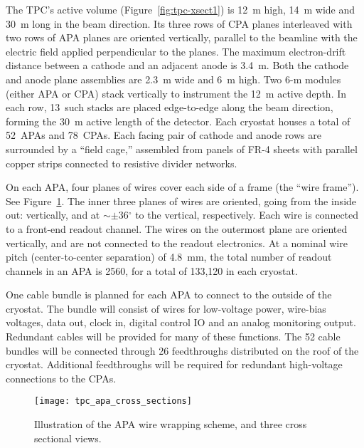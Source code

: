 The TPC's active volume (Figure~\ref{fig:tpc-xsect1}) is 12~m high, 14~m wide and 30~m long in the beam direction. 
Its three rows of CPA planes interleaved with two rows of APA planes 
are oriented vertically, parallel to the beamline with the  
electric field applied perpendicular to the planes.
The maximum electron-drift distance between a cathode and an adjacent 
anode is 3.4~m. Both the cathode and anode plane assemblies are 
2.3~m wide and 6~m high. Two 6-m modules (either APA or CPA)  stack vertically to 
instrument the 12~m active depth. In each row, 13~such stacks are placed 
edge-to-edge 
along the beam direction, forming the 30~m active length of the detector.
Each cryostat houses a total of 52~APAs and 78~CPAs.
Each facing pair of cathode and anode rows are surrounded by a 
``field cage,'' assembled from panels of FR-4 sheets with parallel copper strips connected to resistive divider networks. 

On each APA, four planes of wires cover each side of a frame (the ``wire frame''). See Figure~\ref{fig:tpc-wire-frame-xsect}.
The inner three planes of wires are oriented, going from the inside out: vertically, and at $\sim\pm$36$^\circ$ 
to the vertical, respectively. Each wire is connected to a front-end readout channel.
The wires on the outermost plane are oriented vertically, and are not connected to the readout electronics.
At a nominal wire pitch (center-to-center separation) of 4.8~mm,
the total number of readout channels in an APA is 2560, for a total of 133,120 in each cryostat.
 

One cable bundle is planned for each APA to connect to the outside of the cryostat. The bundle will consist of wires for low-voltage power, wire-bias voltages, data out, clock in, digital control IO and an analog monitoring output. Redundant cables will be provided for many of these functions. The 52 cable bundles will be connected through 26 feedthroughs distributed on the roof of the cryostat. Additional feedthroughs will be required for redundant high-voltage connections to the CPAs. 




\begin{figure}[htpb]
\centering
\texttt{[image: tpc\_apa\_cross\_sections]}
\caption[Illustration of the APA wire wrapping scheme]{Illustration of the APA wire wrapping scheme, and three cross sectional views. } 
\label{fig:tpc-wire-frame-xsect}
\end{figure}

